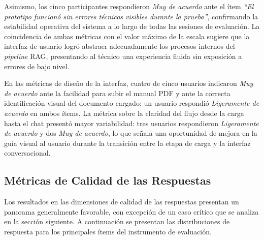 {{Asimismo, los cinco participantes respondieron \textit{Muy de acuerdo} ante el ítem \textit{``El prototipo funcionó sin errores técnicos visibles durante la prueba''}, confirmando la estabilidad operativa del sistema a lo largo de todas las sesiones de evaluación. La coincidencia de ambas métricas con el valor máximo de la escala sugiere que la interfaz de usuario logró abstraer adecuadamente los procesos internos del \textit{pipeline} RAG, presentando al técnico una experiencia fluida sin exposición a errores de bajo nivel.

En las métricas de diseño de la interfaz, cuatro de cinco usuarios indicaron \textit{Muy de acuerdo} ante la facilidad para subir el manual PDF y ante la correcta identificación visual del documento cargado; un usuario respondió \textit{Ligeramente de acuerdo} en ambos ítems. La métrica sobre la claridad del flujo desde la carga hasta el chat presentó mayor variabilidad: tres usuarios respondieron \textit{Ligeramente de acuerdo} y dos \textit{Muy de acuerdo}, lo que señala una oportunidad de mejora en la guía visual al usuario durante la transición entre la etapa de carga y la interfaz conversacional.

\subsection{Métricas de Calidad de las Respuestas}

Los resultados en las dimensiones de calidad de las respuestas presentan un panorama generalmente favorable, con excepción de un caso crítico que se analiza en la sección siguiente. A continuación se presentan las distribuciones de respuesta para los principales ítems del instrumento de evaluación.

}}
